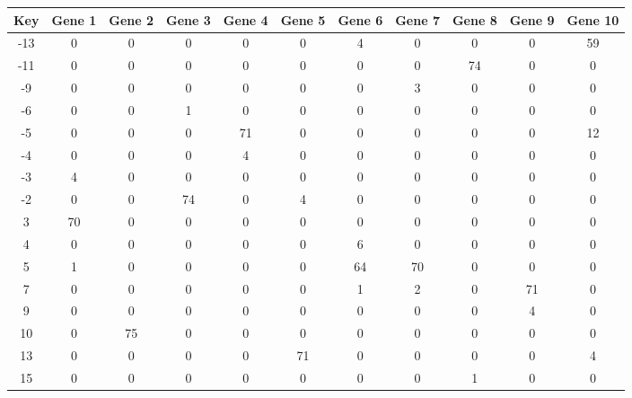 \begin{tabular}{|c|c|c|c|c|c|c|c|c|c|c|}
\hline
Key & Gene 1 & Gene 2 & Gene 3 & Gene 4 & Gene 5 & Gene 6 & Gene 7 & Gene 8 & Gene 9 & Gene 10 \\
\hline
-13 & 0 & 0 & 0 & 0 & 0 & 4 & 0 & 0 & 0 & 59 \\
-11 & 0 & 0 & 0 & 0 & 0 & 0 & 0 & 74 & 0 & 0 \\
-9 & 0 & 0 & 0 & 0 & 0 & 0 & 3 & 0 & 0 & 0 \\
-6 & 0 & 0 & 1 & 0 & 0 & 0 & 0 & 0 & 0 & 0 \\
-5 & 0 & 0 & 0 & 71 & 0 & 0 & 0 & 0 & 0 & 12 \\
-4 & 0 & 0 & 0 & 4 & 0 & 0 & 0 & 0 & 0 & 0 \\
-3 & 4 & 0 & 0 & 0 & 0 & 0 & 0 & 0 & 0 & 0 \\
-2 & 0 & 0 & 74 & 0 & 4 & 0 & 0 & 0 & 0 & 0 \\
3 & 70 & 0 & 0 & 0 & 0 & 0 & 0 & 0 & 0 & 0 \\
4 & 0 & 0 & 0 & 0 & 0 & 6 & 0 & 0 & 0 & 0 \\
5 & 1 & 0 & 0 & 0 & 0 & 64 & 70 & 0 & 0 & 0 \\
7 & 0 & 0 & 0 & 0 & 0 & 1 & 2 & 0 & 71 & 0 \\
9 & 0 & 0 & 0 & 0 & 0 & 0 & 0 & 0 & 4 & 0 \\
10 & 0 & 75 & 0 & 0 & 0 & 0 & 0 & 0 & 0 & 0 \\
13 & 0 & 0 & 0 & 0 & 71 & 0 & 0 & 0 & 0 & 4 \\
15 & 0 & 0 & 0 & 0 & 0 & 0 & 0 & 1 & 0 & 0 \\
\hline
\end{tabular}